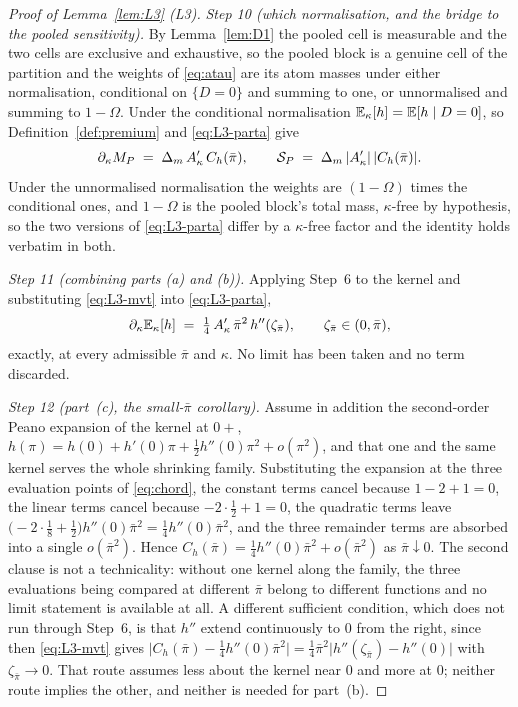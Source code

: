 \begin{proof}[Proof of Lemma~\ref{lem:L3} (L3)]
\emph{Step 10 (which normalisation, and the bridge to the pooled sensitivity).} By
Lemma~\ref{lem:D1} the pooled cell is measurable and the two cells are exclusive and exhaustive, so
the pooled block is a genuine cell of the partition and the weights of \eqref{eq:atau} are its atom
masses under either normalisation, conditional on $\{D=0\}$ and summing to one, or unnormalised and
summing to $1-\Omega$. Under the conditional normalisation $\mathbb{E}_\kappa[h] = \mathbb{E}[h \mid D=0]$, so
Definition~\ref{def:premium} and \eqref{eq:L3-parta} give
\begin{equation}
\label{eq:L3-SP}
\partial_\kappa M_P \;=\; \Delta_m\,A'_{\kappa}\,C_h(\bar\pi),
\qquad
\mathcal S_P \;=\; \Delta_m\,\lvert A'_{\kappa}\rvert\,\lvert C_h(\bar\pi)\rvert .
\end{equation}
Under the unnormalised normalisation the weights are $(1-\Omega)$ times the conditional ones, and
$1-\Omega$ is the pooled block's total mass, $\kappa$-free by hypothesis, so the two versions of
\eqref{eq:L3-parta} differ by a $\kappa$-free factor and the identity holds verbatim in both.

\emph{Step 11 (combining parts (a) and (b)).} Applying Step~6 to the kernel and substituting
\eqref{eq:L3-mvt} into \eqref{eq:L3-parta},
\begin{equation}
\label{eq:L3-exact}
\partial_\kappa\mathbb{E}_\kappa[h] \;=\; \tfrac14\,A'_{\kappa}\,\bar\pi^2\,h''(\zeta_{\bar\pi}),
\qquad \zeta_{\bar\pi} \in (0,\bar\pi),
\end{equation}
exactly, at every admissible $\bar\pi$ and $\kappa$. No limit has been taken and no term discarded.

\emph{Step 12 (part~(c), the small-$\bar\pi$ corollary).} Assume in addition the second-order Peano
expansion of the kernel at $0+$, $h(\pi) = h(0)+h'(0)\pi+\tfrac12h''(0)\pi^2+o(\pi^2)$, and that one
and the same kernel serves the whole shrinking family. Substituting the expansion at the three
evaluation points of \eqref{eq:chord}, the constant terms cancel because $1-2+1 = 0$, the linear
terms cancel because $-2\cdot\tfrac12+1 = 0$, the quadratic terms leave
$\bigl(-2\cdot\tfrac18+\tfrac12\bigr)h''(0)\bar\pi^2 = \tfrac14h''(0)\bar\pi^2$, and the three
remainder terms are absorbed into a single $o(\bar\pi^2)$. Hence
$C_h(\bar\pi) = \tfrac14h''(0)\bar\pi^2 + o(\bar\pi^2)$ as $\bar\pi \downarrow 0$. The second clause
is not a technicality: without one kernel along the family, the three evaluations being compared at
different $\bar\pi$ belong to different functions and no limit statement is available at all. A
different sufficient condition, which does not run through Step~6, is that $h''$ extend continuously
to $0$ from the right, since then \eqref{eq:L3-mvt} gives
$\bigl|C_h(\bar\pi)-\tfrac14h''(0)\bar\pi^2\bigr|
= \tfrac14\bar\pi^2\bigl|h''(\zeta_{\bar\pi})-h''(0)\bigr|$ with
$\zeta_{\bar\pi} \to 0$. That route assumes less about the kernel near $0$ and more at $0$; neither
route implies the other, and neither is needed for part~(b).


\end{proof}
